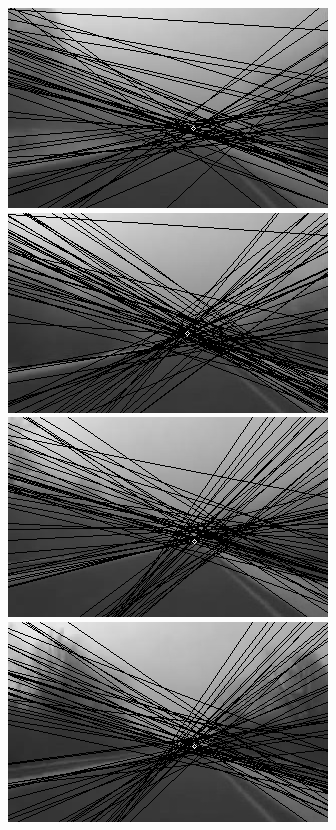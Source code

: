 \documentclass[12pt]{report}
\begin{document}
\begin{figure}
\begin{minipage}[c]{0.5\linewidth}
	\includegraphics[scale=\imTrackScale]{images/bF_0000_50.png}
	\includegraphics[scale=\imTrackScale]{images/bF_0020_50.png}
	\includegraphics[scale=\imTrackScale]{images/bF_0040_50.png}
	\includegraphics[scale=\imTrackScale]{images/bF_0060_50.png}
\end{minipage}
\begin{minipage}[c]{0.5\linewidth}

\end{minipage}
\end{figure}
\end{document}
